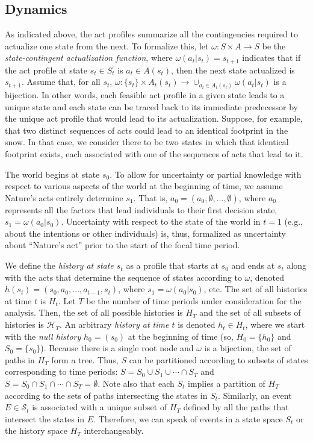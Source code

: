 \documentclass[
11pt,
titlepage,
reqno,
]{article}%
\theoremstyle{definition}
\begin{document}
	\subsection{Dynamics  } 
	  
	As indicated above, the act profiles summarize all the contingencies required to actualize one state from the next. 
	To formalize this, let $\omega:S\times A\rightarrow S$ be the \textit{state-contingent actualization function}, where $\omega(a_t|s_t)=s_{t+1}$ indicates that if the act profile at state $s_t\in S_{t}$ is $a_t\in A(s_t)$, then the next state actualized is $s_{t+1}$.
	Assume that, for all $s_t$, $\omega:\{s_t\}\times A_t(s_t)\rightarrow \cup_{a_t\in A_t(s_t)} \omega(a_t|s_t)$ is a bijection.
	In other words, each feasible  act profile in a given state leads to a unique state and each state can be traced back to its immediate predecessor by the unique act profile that would lead to its actualization.
	Suppose, for example, that two distinct sequences of acts could lead to an identical footprint in the snow.
	In that case, we consider there to be two states in which that identical footprint exists, each associated with one of the sequences of acts that lead to it. 

	The world begins at state $s_0$.
	To allow for uncertainty or partial knowledge with respect to various aspects of the world at the beginning of time, we assume Nature's acts entirely determine $s_{1}$. 
	That is, $a_{0}=(a_0,\emptyset,\ldots,\emptyset)$, where $a_0$ represents all the factors that lead individuals to their  first decision state, $s_1=\omega(a_0|s_0)$.
	Uncertainty with respect to the state of the world in $t=1$ (e.g., about the intentions or other individuals) is, thus, formalized as uncertainty about ``Nature's act'' prior to the start of the focal time period.
	
	We define the \textit{history at state $s_t$} as a profile that starts at $s_0$ and ends at $s_t$ along with the  acts that determine the sequence of states according to $\omega$, denoted $h(s_t)=(s_0,a_0,\ldots,a_{t-1},s_t)$, where $s_1=\omega(a_0|s_0)$, etc.
	The set of all histories at time $t$ is $H_t$.
	Let $T$ be the number of time periods under consideration for the analysis.
	Then,  the set of all possible histories is $H_T$ and the set of all subsets of histories is $\mathcal{H}_T$.
	An arbitrary \textit{history at time $t$} is denoted $h_t\in H_t$, where we start with the \textit{null history} $h_0=(s_0)$ at the beginning of time (so, $H_0=\{h_0\}$ and  $S_0=\{s_0\}$).   
	Because there is a single root node and $\omega$ is a bijection, the set of paths in $H_T$ form a tree.
	Thus, $S$ can be partitioned according to  subsets of states corresponding to time periods: $S=S_0\cup S_1\cup \cdots\cap S_T$ and $S=S_0\cap S_1\cap \cdots\cap S_T = \emptyset$.
	Note also that each $S_t$ implies a partition of $H_T$ according to the sets of paths intersecting the states in $S_t$.
	Similarly, an event $E\in\mathcal{S}_t$ is associated with a unique subset of $H_T$ defined by all the paths that intersect the states in $E$. 
	Therefore, we can speak of events in a state space $S_t$  or the history space $H_T$ interchangeably.
	 
\end{document}
